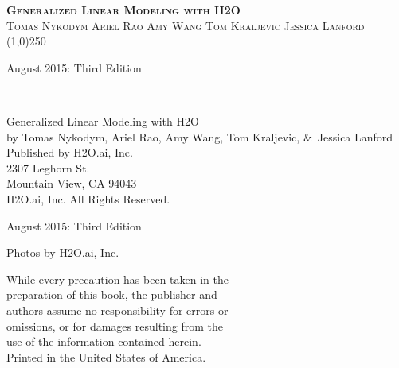 








\thispagestyle{empty} %

\begin{center}
\textsc{\Large\bf{Generalized Linear Modeling with H2O}}
\\
\bigskip
\textsc{\small{Tomas Nykodym \hspace{20pt} Ariel Rao \hspace{20pt} Amy Wang \hspace{20pt} Tom Kraljevic \hspace{20pt} Jessica Lanford}}
\\
\bigskip
\line(1,0){250}  %

\bigskip
August 2015: Third Edition 
\\%
\bigskip
\end{center}

{\raggedright\vfill\ 

Generalized Linear Modeling with H2O\\
  by Tomas Nykodym, Ariel Rao, Amy Wang, Tom Kraljevic, \&\ Jessica Lanford \\
\bigskip
  Published by H2O.ai, Inc. \\
2307 Leghorn St. \\
Mountain View, CA 94043\\
\bigskip
{} H2O.ai, Inc. All Rights Reserved. 
\bigskip

August 2015: Third Edition
\bigskip

Photos by \textcopyright H2O.ai, Inc. 
\bigskip

While every precaution has been taken in the\\
preparation of this book, the publisher and\\
authors assume no responsibility for errors or\\
omissions, or for damages resulting from the\\
use of the information contained herein.\\
\bigskip
Printed in the United States of America. 
}

